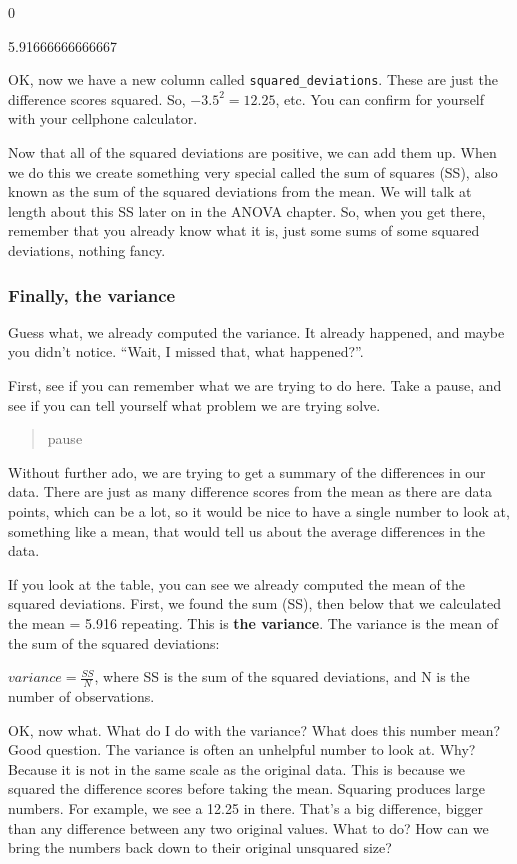 \documentclass[]{book}
\begin{document}
0

5.91666666666667

OK, now we have a new column called \texttt{squared\_deviations}. These are just the difference scores squared. So, \(-3.5^2 = 12.25\), etc. You can confirm for yourself with your cellphone calculator.

Now that all of the squared deviations are positive, we can add them up. When we do this we create something very special called the sum of squares (SS), also known as the sum of the squared deviations from the mean. We will talk at length about this SS later on in the ANOVA chapter. So, when you get there, remember that you already know what it is, just some sums of some squared deviations, nothing fancy.

\hypertarget{finally-the-variance}{%
\subsubsection{Finally, the variance}\label{finally-the-variance}}

Guess what, we already computed the variance. It already happened, and maybe you didn't notice. ``Wait, I missed that, what happened?''.

First, see if you can remember what we are trying to do here. Take a pause, and see if you can tell yourself what problem we are trying solve.

\begin{quote}
pause
\end{quote}

Without further ado, we are trying to get a summary of the differences in our data. There are just as many difference scores from the mean as there are data points, which can be a lot, so it would be nice to have a single number to look at, something like a mean, that would tell us about the average differences in the data.

If you look at the table, you can see we already computed the mean of the squared deviations. First, we found the sum (SS), then below that we calculated the mean = 5.916 repeating. This is \textbf{the variance}. The variance is the mean of the sum of the squared deviations:

\(variance = \frac{SS}{N}\), where SS is the sum of the squared deviations, and N is the number of observations.

OK, now what. What do I do with the variance? What does this number mean? Good question. The variance is often an unhelpful number to look at. Why? Because it is not in the same scale as the original data. This is because we squared the difference scores before taking the mean. Squaring produces large numbers. For example, we see a 12.25 in there. That's a big difference, bigger than any difference between any two original values. What to do? How can we bring the numbers back down to their original unsquared size?
\end{document}
